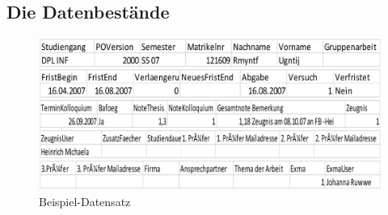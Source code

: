 \subsection{Die Datenbestände}

\begin{figure}[H]
	\centering
	\includegraphics[scale=0.3]{images/01beispieldatensatzcsv.jpg} 
	\caption{Beispiel-Datensatz}\label{fig:schema2}
\end{figure}
